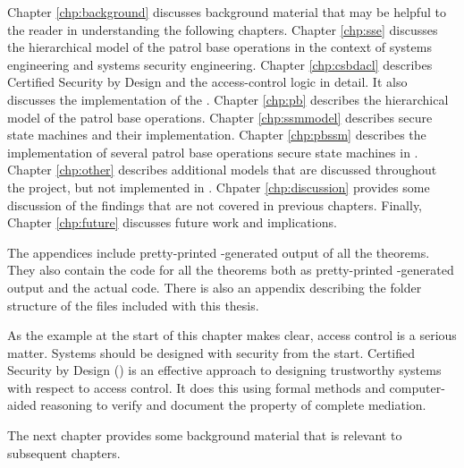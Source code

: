 \documentclass[../../main/main.tex]{subfiles}
\begin{document}
Chapter \ref{chp:background} discusses background material that may be helpful to the reader in understanding the following chapters.  Chapter \ref{chp:sse} discusses the hierarchical model of the patrol base operations in the context of systems engineering and systems security engineering.  Chapter \ref{chp:csbdacl} describes Certified Security by Design and the access-control logic in detail.  It also discusses the  implementation of the .  Chapter \ref{chp:pb} describes the hierarchical model of the patrol base operations. Chapter \ref{chp:ssmmodel} describes secure state machines and their  implementation.  Chapter \ref{chp:pbssm} describes the implementation of several patrol base operations secure state machines in .  Chapter \ref{chp:other} describes additional models that are discussed throughout the project, but not implemented in .  Chpater \ref{chp:discussion} provides some discussion of the findings that are not covered in previous chapters.  Finally, Chapter \ref{chp:future} discusses future work and implications. 

The appendices include pretty-printed -generated output of all the  theorems.  They also contain the code for all the  theorems both as pretty-printed -generated output and the actual code.  There is also an appendix describing the folder structure of the files included with this thesis.


As the example at the start of this chapter makes clear, access control is a serious matter.  Systems should be designed with security from the start.   Certified Security by Design ()  is an effective approach to designing trustworthy systems with respect to access control.  It does this using formal methods and computer-aided reasoning to verify and document the property of complete mediation.

The next chapter provides some background material that is relevant to subsequent chapters.
\end{document}

